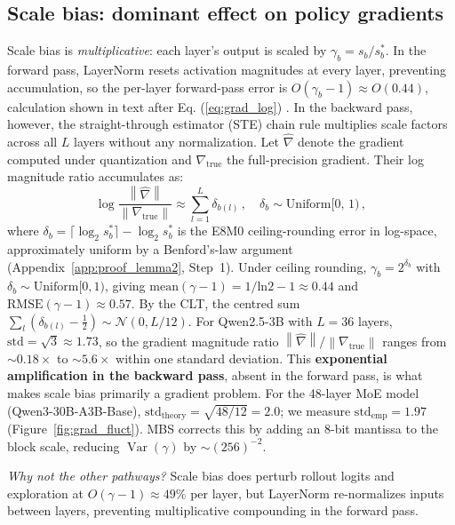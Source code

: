 \documentclass{article}
\theoremstyle{definition}
\theoremstyle{remark}
\DeclareMathOperator{\Var}{Var}
\newcommand{\cN}{\mathcal{N}}
\newcommand{\norm}[1]{\left\|#1\right\|}
\begin{document}
\subsection{Scale bias: dominant effect on policy gradients}
\label{sec:pathway_gradient}

Scale bias is \emph{multiplicative}: each layer's output is scaled by $\gamma_b = s_b/s_b^*$. In the forward pass, LayerNorm resets activation magnitudes at every layer, preventing accumulation, so the per-layer forward-pass error is $O(\gamma_b {-} 1) \approx O(0.44)$, calculation shown in text after Eq. (\ref{eq:grad_log}) . In the backward pass, however, the straight-through estimator (STE) chain rule multiplies scale factors across all $L$ layers without any normalization. Let $\hat{\nabla}$ denote the gradient computed under quantization and $\nabla_{\mathrm{true}}$ the full-precision gradient. Their log magnitude ratio accumulates as:
\begin{equation}
\label{eq:grad_log}
  \log \frac{\norm{\hat{\nabla}}}{\norm{\nabla_{\mathrm{true}}}}
  \approx \sum_{l=1}^L \delta_{b(l)}\,,
  \quad \delta_b \sim \mathrm{Uniform}[0,\, 1)\,,
\end{equation}
where $\delta_b = \lceil\log_2 s_b^*\rceil - \log_2 s_b^*$ is the E8M0 ceiling-rounding error in log-space, approximately uniform by a Benford's-law argument (Appendix~\ref{app:proof_lemma2}, Step~1). Under ceiling rounding, $\gamma_b = 2^{\delta_b}$ with $\delta_b \sim \mathrm{Uniform} [0,1)$, giving $\mathrm{mean}(\gamma-1) = 1/\mathrm{ln}2 - 1 \approx 0.44$ and $\mathrm{RMSE}(\gamma-1) \approx 0.57$.
By the CLT, the centred sum $\sum_l (\delta_{b(l)} - \tfrac{1}{2}) \sim \cN(0, L/12)$. For Qwen2.5-3B with $L{=}36$ layers, $\mathrm{std} = \sqrt{3} \approx 1.73$, so the gradient magnitude ratio $\norm{\hat{\nabla}}/\norm{\nabla_{\mathrm{true}}}$ ranges from ${\sim}0.18\times$ to ${\sim}5.6\times$ within one standard deviation. This \textbf{exponential amplification in the backward pass}, absent in the forward pass, is what makes scale bias primarily a gradient problem. For the 48-layer MoE model (Qwen3-30B-A3B-Base), $\mathrm{std}_{\mathrm{theory}} = \sqrt{48/12} = 2.0$; we measure $\mathrm{std}_{\mathrm{emp}} = 1.97$ (Figure~\ref{fig:grad_fluct}). MBS corrects this by adding an 8-bit mantissa to the block scale, reducing $\Var(\gamma)$ by ${\sim}(256)^{-2}$.


\emph{Why not the other pathways?} Scale bias does perturb rollout logits and exploration at $O(\gamma{-}1) \approx 49\%$ per layer, but LayerNorm re-normalizes inputs between layers, preventing multiplicative compounding in the forward pass.
\end{document}
